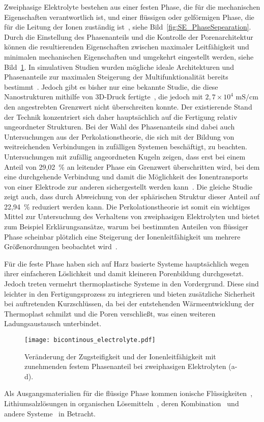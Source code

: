 Zweiphasige Elektrolyte bestehen aus einer festen Phase, die für die mechanischen Eigenschaften verantwortlich ist, und einer flüssigen oder gelförmigen Phase, die für die Leitung der Ionen zuständig ist~\cite{Ichino1995}, siehe Bild~\ref{fig:SE_PhaseSepearation}. Durch die Einstellung des Phasenanteils und die Kontrolle der Porenarchitektur können die resultierenden Eigenschaften zwischen maximaler Leitfähigkeit und minimalen mechanischen Eigenschaften und umgekehrt eingestellt werden, siehe Bild~\ref{fig:bicontinous_electrolyte}. In simulativen Studien wurden mögliche ideale Architekturen und Phasenanteile zur maximalen Steigerung der Multifunktionalität bereits bestimmt~\cite{Lee2019,Tu2020}. Jedoch gibt es bisher nur eine bekannte Studie, die diese Nanostrukturen mithilfe von 3D-Druck fertigte~\cite{Zekoll2018}, die jedoch mit $2,7 \times 10^4$ $\si{\milli \siemens \per \cm}$ den angestrebten Grenzwert nicht überschreiten konnte. Der existierende Stand der Technik konzentriert sich daher hauptsächlich auf die Fertigung relativ ungeordneter Strukturen. Bei der Wahl des Phasenanteils sind dabei auch Untersuchungen aus der Perkolationstheorie, die sich mit der Bildung von weitreichenden Verbindungen in zufälligen Systemen beschäftigt, zu beachten. Untersuchungen mit zufällig angeordneten Kugeln zeigen, dass erst bei einem Anteil von 29,02~\% an leitender Phase ein Grenzwert überschritten wird, bei dem eine durchgehende Verbindung und damit die Möglichkeit des Ionentransports von einer Elektrode zur anderen sichergestellt werden kann~\cite{Li2020b}. Die gleiche Studie zeigt auch, dass durch Abweichung von der sphärischen Struktur dieser Anteil auf 22,94~\% reduziert werden kann. Die Perkolationstheorie ist somit ein wichtiges Mittel zur Untersuchung des Verhaltens von zweiphasigen Elektrolyten und bietet zum Beispiel Erklärungsansätze, warum bei bestimmten Anteilen von flüssiger Phase scheinbar plötzlich eine Steigerung der Ionenleitfähigkeit um mehrere Größenordnungen beobachtet wird~\cite{Melodia2023}.

Für die feste Phase haben sich auf Harz basierte Systeme hauptsächlich wegen ihrer einfacheren Löslichkeit und damit kleineren Porenbildung durchgesetzt. Jedoch treten vermehrt thermoplastische Systeme in den Vordergrund. Diese sind leichter in den Fertigungsprozess zu integrieren und bieten zusätzliche Sicherheit bei auftretenden Kurzschlüssen, da bei der entstehenden Wärmeentwicklung der Thermoplast schmilzt und die Poren verschließt, was einen weiteren Ladungsaustausch unterbindet.
\begin{figure}[ht]
        \center
	\texttt{[image: bicontinous\_electrolyte.pdf]}
		\caption{\label{fig:bicontinous_electrolyte}Veränderung der Zugsteifigkeit und der Ionenleitfähigkeit mit zunehmenden festem Phasenanteil bei zweiphasigen Elektrolyten (a-d).}
\end{figure}
Als Ausgangsmaterialien für die flüssige Phase kommen ionische Flüssigkeiten~\cite{Huang2022,Shirshova2013,Wendong2021,Shirshova2014,Dzienia2020}, Lithiumsalzlösungen in organischen Lösemitteln~\cite{Gienger2015,Sakakibara2017}, deren Kombination~\cite{Shirshova2014,Yu2016} und andere Systeme~\cite{Feng2017} in Betracht.

